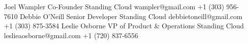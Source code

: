 
\begin{referees}
		{Joel Wampler}
		{Co-Founder}
		{Standing Cloud}
		{wampler@gmail.com}
    {+1 (303) 956-7610}
    {Debbie O'Neill}
    {Senior Developer}
    {Standing Cloud}
    {debbietoneill@gmail.com}
    {+1 (303) 875-3584}
    {Leslie Osborne}
    {VP of Product \& Operations}
    {Standing Cloud}
    {leslieaosborne@gmail.com}
    {+1 (720) 837-6556}
\end{referees}
